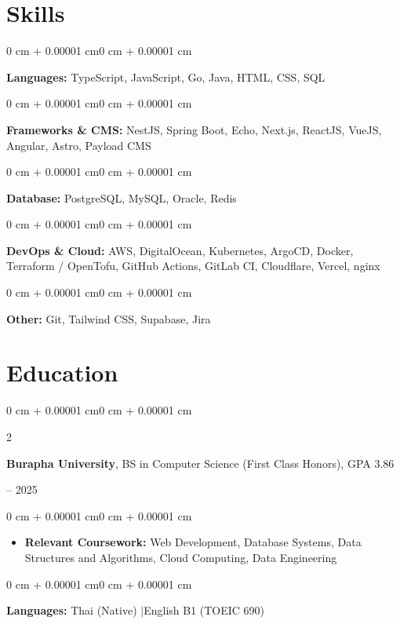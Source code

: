 \documentclass[10pt, letterpaper]{article}
\newenvironment{highlights}{
    \begin{itemize}[
        topsep=0.06 cm,
        parsep=0.06 cm,
        partopsep=0pt,
        itemsep=0pt,
        leftmargin=0.4 cm + 10pt
    ]
}{
    \end{itemize}
}
\newenvironment{onecolentry}{
    \begin{adjustwidth}{0 cm + 0.00001 cm}{0 cm + 0.00001 cm}
}{
    \end{adjustwidth}
}
\newenvironment{twocolentry}[2][]{
    \onecolentry
    \def\secondColumn{#2}
    \setcolumnwidth{\fill, 4.5 cm}
    \begin{paracol}{2}
}{
    \switchcolumn \raggedleft \secondColumn
    \end{paracol}
    \endonecolentry
}
\begin{document}
    \section{Skills}
        \begin{onecolentry}
            \textbf{Languages:} TypeScript, JavaScript, Go, Java, HTML, CSS, SQL
        \end{onecolentry}

        \vspace{0.12 cm}

        \begin{onecolentry}
            \textbf{Frameworks \& CMS:} NestJS, Spring Boot, Echo, Next.js, ReactJS, VueJS, Angular, Astro, Payload CMS
        \end{onecolentry}

        \vspace{0.12 cm}

        \begin{onecolentry}
            \textbf{Database:} PostgreSQL, MySQL, Oracle, Redis
        \end{onecolentry}

        \vspace{0.12 cm}

        \begin{onecolentry}
            \textbf{DevOps \& Cloud:} AWS, DigitalOcean, Kubernetes, ArgoCD, Docker, Terraform / OpenTofu, GitHub Actions, GitLab CI, Cloudflare, Vercel, nginx
        \end{onecolentry}

        \vspace{0.12 cm}

        \begin{onecolentry}
            \textbf{Other:} Git, Tailwind CSS, Supabase, Jira
        \end{onecolentry}


    \section{Education}
        \begin{twocolentry}{
            2021 -- 2025
        }
            \textbf{Burapha University}, BS in Computer Science (First Class Honors), GPA 3.86
        \end{twocolentry}

        \vspace{0.10 cm}
        \begin{onecolentry}
            \begin{highlights}
                \item \textbf{Relevant Coursework:} Web Development, Database Systems, Data Structures and Algorithms, Cloud Computing, Data Engineering
            \end{highlights}
        \end{onecolentry}

        \vspace{0.15 cm}
        \begin{onecolentry}
            \textbf{Languages:} Thai (Native) \quad$|$\quad English B1 (TOEIC 690)
        \end{onecolentry}
\end{document}
